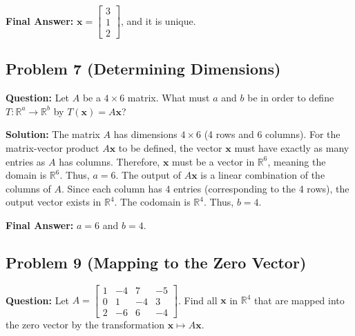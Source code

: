 \documentclass[11pt]{article}
\begin{document}
\textbf{Final Answer:} $\mathbf{x} = \begin{bmatrix} 3 \\ 1 \\ 2 \end{bmatrix}$, and it is unique.

\subsection{Problem 7 (Determining Dimensions)}
\textbf{Question:} Let $A$ be a $4 \times 6$ matrix. What must $a$ and $b$ be in order to define $T: \mathbb{R}^a \to \mathbb{R}^b$ by $T(\mathbf{x}) = A\mathbf{x}$?

\textbf{Solution:}
The matrix $A$ has dimensions $4 \times 6$ (4 rows and 6 columns). 
For the matrix-vector product $A\mathbf{x}$ to be defined, the vector $\mathbf{x}$ must have exactly as many entries as $A$ has columns. Therefore, $\mathbf{x}$ must be a vector in $\mathbb{R}^6$, meaning the domain is $\mathbb{R}^6$. Thus, $a = 6$.
The output of $A\mathbf{x}$ is a linear combination of the columns of $A$. Since each column has 4 entries (corresponding to the 4 rows), the output vector exists in $\mathbb{R}^4$. The codomain is $\mathbb{R}^4$. Thus, $b = 4$.

\textbf{Final Answer:} $a = 6$ and $b = 4$.

\subsection{Problem 9 (Mapping to the Zero Vector)}
\textbf{Question:} Let $A = \begin{bmatrix} 1 & -4 & 7 & -5 \\ 0 & 1 & -4 & 3 \\ 2 & -6 & 6 & -4 \end{bmatrix}$. Find all $\mathbf{x}$ in $\mathbb{R}^4$ that are mapped into the zero vector by the transformation $\mathbf{x} \mapsto A\mathbf{x}$.
\end{document}
